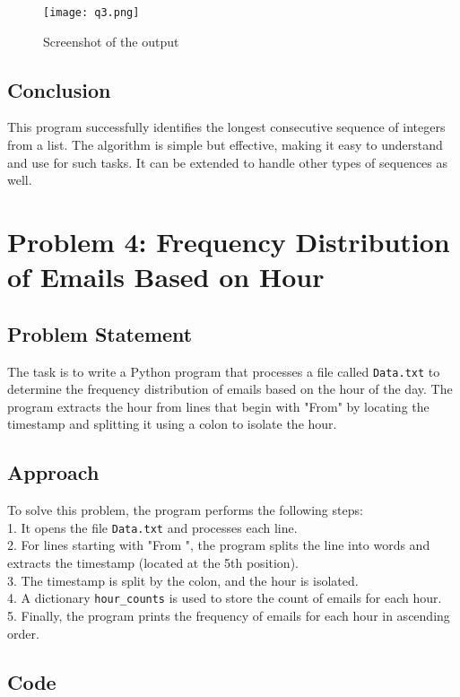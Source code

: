 \documentclass{article}
\begin{document}
\begin{figure}[h!]
    \centering
    \texttt{[image: q3.png]}  %
    \caption{Screenshot of the output}
\end{figure}

\subsection{Conclusion}
This program successfully identifies the longest consecutive sequence of integers from a list. The algorithm is simple but effective, making it easy to understand and use for such tasks. It can be extended to handle other types of sequences as well.
\section{Problem 4: Frequency Distribution of Emails Based on Hour}

\subsection{Problem Statement}
The task is to write a Python program that processes a file called \texttt{Data.txt} to determine the frequency distribution of emails based on the hour of the day. The program extracts the hour from lines that begin with "From" by locating the timestamp and splitting it using a colon to isolate the hour.

\subsection{Approach}
To solve this problem, the program performs the following steps:\\
1. It opens the file \texttt{Data.txt} and processes each line.\\
2. For lines starting with "From ", the program splits the line into words and extracts the timestamp (located at the 5th position).\\
3. The timestamp is split by the colon, and the hour is isolated.\\
4. A dictionary \texttt{hour\_counts} is used to store the count of emails for each hour.\\
5. Finally, the program prints the frequency of emails for each hour in ascending order.\\

\subsection{Code}
\end{document}
